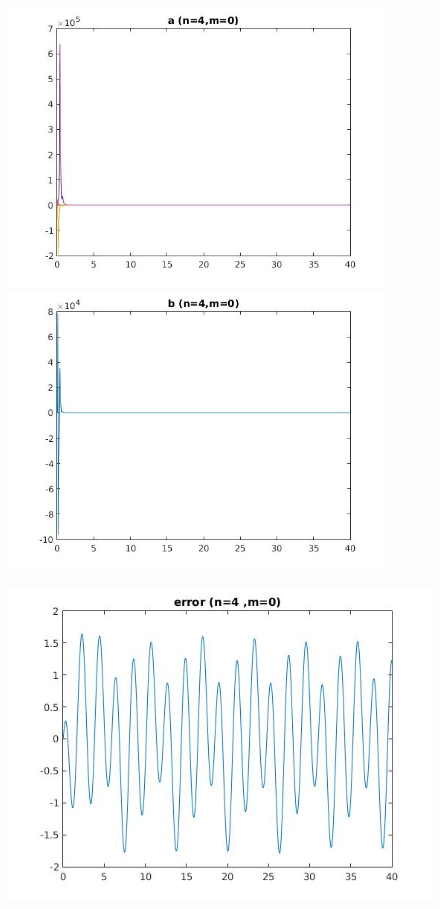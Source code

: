 \documentclass{article}
\begin{document}
\clearpage
\large
\begin{figure}[h!]
\centering 
 	  \begin{minipage}{0.48\textwidth}
     \centering
     \advance\leftskip-4cm
  \includegraphics[width=100mm,scale=2]{assets/try40o.jpg}
   \end{minipage} \hfill
    \begin{minipage}{0.48\textwidth}
  \includegraphics[width=100mm,scale=2]{assets/try40oo.jpg}
  \end{minipage}
\end{figure}
\begin{figure}[h!]
\centering
\advance\leftskip-0.5cm
 \includegraphics[width=140mm,scale=2]{assets/try40ooo.jpg}
\end{figure}
\end{document}
